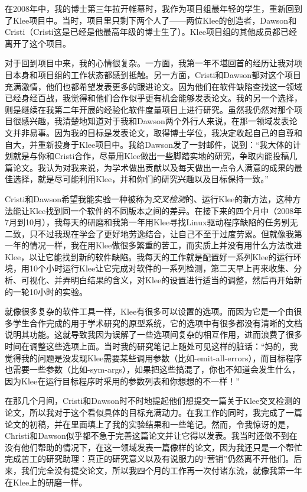 \documentclass[letter,12pt]{book}
\begin{document}
\begin{CJK}{UTF8}{gbsn}

在2008年中，我的博士第三年拉开帷幕时，我作为项目组最年轻的学生，重新回到了Klee项目中。当时，项目里只剩下两个人了——两位Klee的创造者，Dawson和Cristi（Cristi这是已经是他最高年级的博士生了）。Klee项目组的其他成员都已经离开了这个项目。

对于回到项目中来，我的心情很复杂。一方面，我第一年不堪回首的经历让我对项目本身和项目组的工作状态都感到抵触。另一方面，Cristi和Dawson都对这个项目充满激情，他们也都希望发表更多的跟进论文。因为他们在软件缺陷查找这一领域已经身经百战，我觉得和他们合作似乎更有机会能够发表论文。我的另一个选择，则是继续在我第二年开展的经验化软件度量项目上进行研究。虽然我仍然对那个项目很感兴趣，我清楚地知道对于我和Dawson两个外行人来说，在那一领域发表论文并非易事。因为我的目标是发表论文，取得博士学位，我决定收起自己的自尊和自大，并重新投身于Klee项目中。我给Dawson发了一封邮件，说到：“我大体的计划就是与你和Cristi合作，尽量用Klee做出一些脚踏实地的研究，争取内能投稿几篇论文。我认为对我来说，为学术做出贡献以及每天做出一点令人满意的成果的最佳选择，就是尽可能利用Klee，并和你们的研究兴趣以及目标保持一致。”

\breakline

Cristi和Dawson希望我能实验一种被称为\emph{交叉检测}的、运行Klee的新方法，这种方法能让Klee找到同一个软件的不同版本之间的差异。在接下来的四个月中（2008年7月到10月），我每天的研磨和我第一年用Klee寻找Linux驱动程序缺陷的任务别无二致，只不过我现在学会了更好地劳逸结合，让自己不至于过度劳累。但就像我第一年的情况一样，我在用Klee做很多繁重的苦工，而实质上并没有用什么方法改进Klee，以让它能找到新的软件缺陷。我每天的工作就是配置好一系列Klee的运行环境，用10个小时运行Klee让它完成对软件的一系列检测，第二天早上再来收集、分析、可视化、并弄明白结果的含义，对Klee的设置进行适当的调整，然后再开始新的一轮10小时的实验。

就像很多复杂的软件工具一样，Klee有很多可以设置的选项。而因为它是一个由很多学生合作完成的用于学术研究的原型系统，它的选项中有很多都没有清晰的文档说明其功能。这就导致我因为误解了一些选项间复杂的相互作用，进而浪费了很多时间在调整这些选项上面。当时我的研究笔记上随处可见这样的脏话：“妈的，我觉得我的问题是没发现Klee需要某些调用参数（比如-emit-all-errors），而目标程序也需要一些参数（比如-sym-args），如果把这些搞混了，你也不知道会发生什么，因为Klee在运行目标程序时采用的参数列表和你想想的不一样！”

在那几个月间，Cristi和Dawson时不时地提起他们想提交一篇关于Klee交叉检测的论文，所以我对于这个看似具体的目标充满动力。在我工作的同时，我完成了一篇论文的初稿，并在里面填上了我的实验结果和一些笔记。然而，令我惊讶的是，Christi和Dawson似乎都不急于完善这篇论文并让它得以发表。我当时还做不到在没有他们帮助的情况下，在这一领域发表一篇像样的论文，因为我还只是一个帮忙完成苦工的研究助理：真正的研究意义以及有说服力的“营销”仍然离不开他们。后来，我们完全没有提交论文，所以我四个月的工作再一次付诸东流，就像我第一年在Klee上的研磨一样。


\end{CJK}
\end{document}
